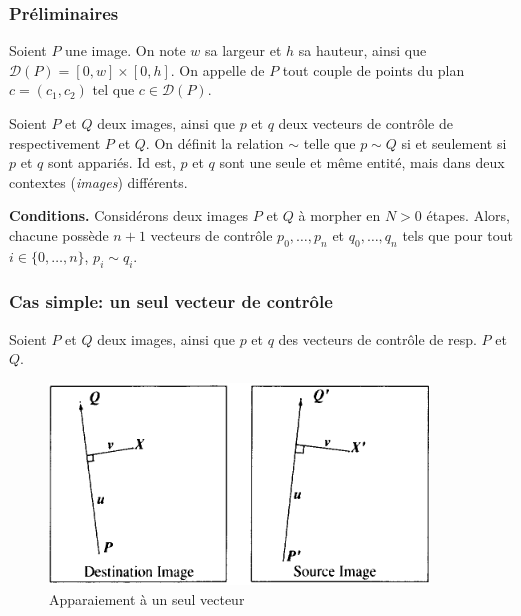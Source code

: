 \subsubsection{Préliminaires}
\begin{definition}
    Soient $P$ une image. On note $w$ sa largeur et $h$ sa hauteur, ainsi que $\mathcal{D}(P)=[0,w]\times[0,h]$.
    On appelle  de $P$ tout couple de points du plan $c=(c_1,c_2)$ tel que $c\in\mathcal{D}(P)$.
\end{definition}

\begin{definition}
    Soient $P$ et $Q$ deux images, ainsi que $p$ et $q$ deux vecteurs de contrôle de respectivement $P$ et $Q$. On définit la
    relation $\sim$ telle que $p \sim Q$ si et seulement si $p$ et $q$ sont appariés. Id est, $p$ et $q$ 
    sont une seule et même entité, mais dans deux contextes (\emph{images}) différents.
\end{definition}
\begin{coder}
    \textbf{Conditions.  } Considérons deux images $P$ et $Q$ à morpher en $N>0$ étapes. 
     Alors, chacune possède $n+1$ vecteurs de contrôle $p_{0},\dots,p_{n}$ et $q_{0},\dots,q_{n}$ tels que pour tout $i \in \{0,\dots,n\}$, $p_{i} \sim q_{i}$.

\end{coder}
\subsubsection{Cas simple: un seul vecteur de contrôle}
\begin{definition}
    Soient $P$ et $Q$ deux images, ainsi que $p$ et $q$ des vecteurs de contrôle de resp. $P$ et $Q$.


\end{definition}
\begin{figure}[h!]
    \centering
    \includegraphics[width=0.8\linewidth]{img/p3/uv.png}
    \caption{Apparaiement à un seul vecteur \cite{beier1992feature}}
    \label{fig:deformation}
\end{figure}